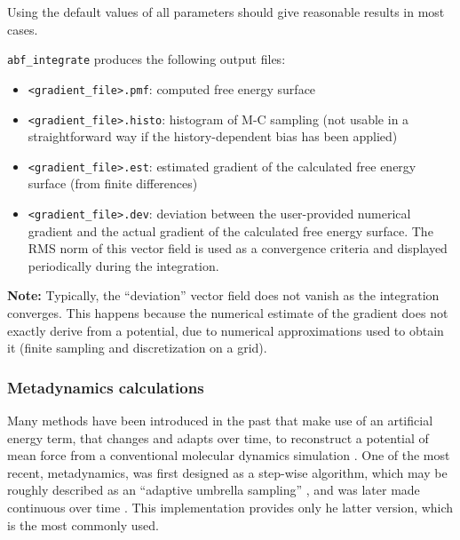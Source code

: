 Using the default values of all parameters should give reasonable results in most cases.

\bigskip
\texttt{abf\_integrate} produces the following output files:
\begin{itemize}
\setlength{\itemsep}{0pt}
\item \texttt{<gradient\_file>.pmf}: computed free energy surface
\item \texttt{<gradient\_file>.histo}: histogram of M-C sampling (not
usable in a straightforward way if the history-dependent bias has been applied)
\item \texttt{<gradient\_file>.est}: estimated gradient of the calculated free energy surface
(from finite differences)
\item \texttt{<gradient\_file>.dev}: deviation between the user-provided numerical gradient
and the actual gradient of the calculated free energy surface. The RMS norm of this vector
field is used as a convergence criteria and displayed periodically during the integration.
\end{itemize}

\textbf{Note:} Typically, the ``deviation'' vector field does not
vanish as the integration converges. This happens because the
numerical estimate of the gradient does not exactly derive from a
potential, due to numerical approximations used to obtain it (finite
sampling and discretization on a grid).



\subsubsection{Metadynamics calculations}
\label{sec:colvarbias_meta}

Many methods have been introduced in the past that make use of an
artificial energy term, that changes and adapts over time, to
reconstruct a potential of mean force from a conventional molecular
dynamics simulation \cite{Huber1994, Grubmuller1995, Voter1997,
  Darve2001, Laio2002, Hummer2003}.  One of the most recent,
metadynamics, was first designed as a step-wise algorithm, which may
be roughly described as an ``adaptive umbrella sampling''
\cite{Laio2002}, and was later made continuous over time
\cite{Iannuzzi2003}.  This implementation provides only he latter
version, which is the most commonly used.

